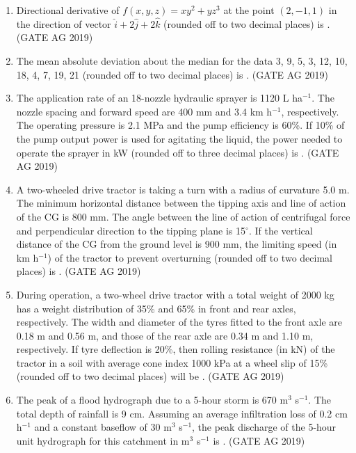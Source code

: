 \documentclass[journal,12pt,onecolumn]{IEEEtran}
\theoremstyle{remark}
\begin{document}
\begin{enumerate}
\item 
Directional derivative of $f(x,y,z) = xy^2 + yz^3$ at the point $(2, -1, 1)$ in the direction of vector $\hat{i} + 2\hat{j} + 2\hat{k}$ (rounded off to two decimal places) is \underline{\hspace{2cm}}.
\hfill{(GATE AG 2019)}

\item 
The mean absolute deviation about the median for the data 3, 9, 5, 3, 12, 10, 18, 4, 7, 19, 21 (rounded off to two decimal places) is \underline{\hspace{2cm}}.
\hfill{(GATE AG 2019)}

\item 
The application rate of an 18-nozzle hydraulic sprayer is 1120 L ha$^{-1}$. The nozzle spacing and forward speed are 400 mm and 3.4 km h$^{-1}$, respectively. The operating pressure is 2.1 MPa and the pump efficiency is 60\%. If 10\% of the pump output power is used for agitating the liquid, the power needed to operate the sprayer in kW (rounded off to three decimal places) is \underline{\hspace{2cm}}.
\hfill{(GATE AG 2019)}

\item 
A two-wheeled drive tractor is taking a turn with a radius of curvature 5.0 m. The minimum horizontal distance between the tipping axis and line of action of the CG is 800 mm. The angle between the line of action of centrifugal force and perpendicular direction to the tipping plane is 15$^\circ$. If the vertical distance of the CG from the ground level is 900 mm, the limiting speed (in km h$^{-1}$) of the tractor to prevent overturning (rounded off to two decimal places) is \underline{\hspace{2cm}}.
\hfill{(GATE AG 2019)}

\item 
During operation, a two-wheel drive tractor with a total weight of 2000 kg has a weight distribution of 35\% and 65\% in front and rear axles, respectively. The width and diameter of the tyres fitted to the front axle are 0.18 m and 0.56 m, and those of the rear axle are 0.34 m and 1.10 m, respectively. If tyre deflection is 20\%, then rolling resistance (in kN) of the tractor in a soil with average cone index 1000 kPa at a wheel slip of 15\% (rounded off to two decimal places) will be \underline{\hspace{2cm}}.
\hfill{(GATE AG 2019)}

\item 
The peak of a flood hydrograph due to a 5-hour storm is 670 m$^{3}$ s$^{-1}$. The total depth of rainfall is 9 cm. Assuming an average infiltration loss of 0.2 cm h$^{-1}$ and a constant baseflow of 30 m$^{3}$ s$^{-1}$, the peak discharge of the 5-hour unit hydrograph for this catchment in m$^{3}$ s$^{-1}$ is \underline{\hspace{2cm}}.
\hfill{(GATE AG 2019)}


\end{enumerate}
\end{document}
